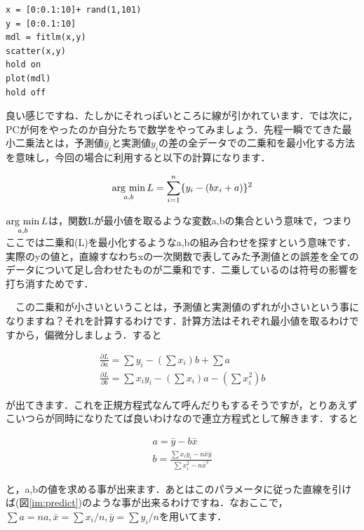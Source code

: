 \documentclass[11pt,a4paper]{jreport}
\newcommand{\argmin}{\mathop{\rm arg~min}\limits}
\begin{document}
\begin{lstlisting}[caption=単回帰のコード,label=sc:scatter]
x = [0:0.1:10]+ rand(1,101)
y = [0:0.1:10]
mdl = fitlm(x,y)
scatter(x,y)
hold on
plot(mdl)
hold off
\end{lstlisting}

良い感じですね．たしかにそれっぽいところに線が引かれています．では次に，PCが何をやったのか自分たちで数学をやってみましょう．先程一瞬でてきた最小二乗法とは，予測値$\hat y_i$と実測値$y_i$の差の全データでの二乗和を最小化する方法を意味し，今回の場合に利用すると以下の計算になります．

\begin{eqnarray}
\argmin_{a,b} L = \sum_{i=1}^n \{ y_i - (bx_i + a) \}^2
\end{eqnarray}

$\argmin_{a,b} L$は，関数Lが最小値を取るような変数a,bの集合という意味で，つまりここでは二乗和(L)を最小化するようなa,bの組み合わせを探すという意味です．実際のyの値と，直線すなわちxの一次関数で表してみた予測値との誤差を全てのデータについて足し合わせたものが二乗和です．二乗しているのは符号の影響を打ち消すためです．

　この二乗和が小さいということは，予測値と実測値のずれが小さいという事になりますね？それを計算するわけです．計算方法はそれぞれ最小値を取るわけですから，偏微分しましょう．すると

\begin{eqnarray}
\frac{\partial L}{\partial a} = \sum y_i -(\sum x_i)b + \sum a \\
\frac{\partial L}{\partial b} = \sum x_i y_i - (\sum x_i)a- (\sum x_i^2)b
\end{eqnarray}

が出てきます．これを正規方程式なんて呼んだりもするそうですが，とりあえずこいつらが同時になりたてば良いわけなので連立方程式として解きます．すると

\begin{eqnarray}
a = \bar y - b\bar x\\
b = \frac{\sum x_i y_i - n \bar{x} \bar{y}}{\sum x_i^2 - n\bar{x}^2}
\end{eqnarray}

と，a,bの値を求める事が出来ます．あとはこのパラメータに従った直線を引けば(図\ref{im:predict})のような事が出来るわけですね．なおここで，$\sum a = na, \bar x = \sum x_i/n, \bar y = \sum y_i/n$を用いてます．
\end{document}
